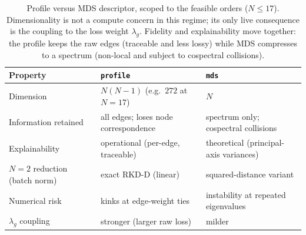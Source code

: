 \documentclass[11pt,letterpaper]{article}
\begin{document}
\begin{table}[htbp]
    \centering
    \small
    \caption{Profile versus MDS descriptor, scoped to the feasible orders
             ($N \leq 17$). Dimensionality is not a compute concern in this regime; its
             only live consequence is the coupling to the loss weight $\lambda_g$.
             Fidelity and explainability move together: the profile keeps the raw edges
             (traceable and less lossy) while MDS compresses to a spectrum (non-local
             and subject to cospectral collisions).}
    \label{tab:descriptor-compare}
    \begin{tabularx}{\linewidth}{@{}l X X@{}}
        \toprule
        Property & \texttt{profile} & \texttt{mds} \\
        \midrule
        Dimension & $N(N{-}1)$ (e.g.\ $272$ at $N{=}17$) & $N$ \\
        Information retained & all edges; loses node correspondence & spectrum only; cospectral collisions \\
        Explainability & operational (per-edge, traceable) & theoretical (principal-axis variances) \\
        $N=2$ reduction (batch norm) & exact RKD-D (linear) & squared-distance variant \\
        Numerical risk & kinks at edge-weight ties & instability at repeated eigenvalues \\
        $\lambda_g$ coupling & stronger (larger raw loss) & milder \\
        \bottomrule
    \end{tabularx}
\end{table}
\end{document}

